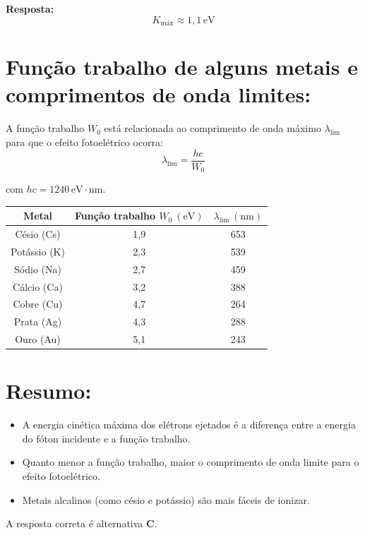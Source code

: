 \documentclass[a4paper,12pt]{article}
\begin{document}
\begin{flushleft}
\textbf{Resposta:}
\[
\boxed{
K_{\text{máx}} \approx 1{,}1\,\mathrm{eV}
}
\]

\section*{Função trabalho de alguns metais e comprimentos de onda limites:}

A função trabalho \( W_0 \) está relacionada ao comprimento de onda máximo \( \lambda_{\text{lim}} \) para que o efeito fotoelétrico ocorra:
\[
\lambda_{\text{lim}} = \frac{hc}{W_0}
\]

com \( hc = 1240\,\mathrm{eV\cdot nm} \).

\bigskip

\begin{center}
\renewcommand{\arraystretch}{1.3}
\begin{tabular}{|c|c|c|}
\hline
\textbf{Metal} & \textbf{Função trabalho \( W_0~(\mathrm{eV}) \)} & \textbf{\( \lambda_{\text{lim}}~(\mathrm{nm}) \)} \\
\hline
Césio (Cs)     & 1,9 & 653 \\ \hline
Potássio (K)   & 2,3 & 539 \\ \hline
Sódio (Na)     & 2,7 & 459 \\ \hline
Cálcio (Ca)    & 3,2 & 388 \\ \hline
Cobre (Cu)     & 4,7 & 264 \\ \hline
Prata (Ag)     & 4,3 & 288 \\ \hline
Ouro (Au)      & 5,1 & 243 \\ \hline
\hline
\end{tabular}
\end{center}

\section*{Resumo:}
\begin{itemize}
    \item A energia cinética máxima dos elétrons ejetados é a diferença entre a energia do fóton incidente e a função trabalho.
    \item Quanto menor a função trabalho, maior o comprimento de onda limite para o efeito fotoelétrico.
    \item Metais alcalinos (como césio e potássio) são mais fáceis de ionizar.
\end{itemize}

A resposta correta é alternativa \colorbox{green!50}{\textbf{C}}.
\end{flushleft}
\end{document}
